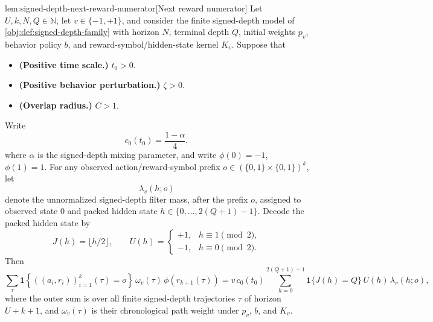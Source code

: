 \documentclass[11pt]{article}
\begin{document}
\begin{lemmav}{lem:signed-depth-next-reward-numerator}[Next reward numerator]
Let \(U,k,N,Q\in\mathbb N\), let \(v\in\{-1,+1\}\), and consider the finite signed-depth model of \cref{obj:def:signed-depth-family} with horizon \(N\), terminal depth \(Q\), initial weights \(p_v\), behavior policy \(b\), and reward-symbol/hidden-state kernel \(K_v\). Suppose that
\begin{itemize}
\item \textbf{(Positive time scale.)} \(t_0>0\).
\item \textbf{(Positive behavior perturbation.)} \(\zeta>0\).
\item \textbf{(Overlap radius.)} \(C>1\).
\end{itemize}
Write
\[
c_0(t_0)=\frac{1-\alpha}{4},
\]
where \(\alpha\) is the signed-depth mixing parameter, and write \(\phi(0)=-1\), \(\phi(1)=1\).  For any observed action/reward-symbol prefix \(o\in(\{0,1\}\times\{0,1\})^k\), let
\[
\lambda_v(h;o)
\]
denote the unnormalized signed-depth filter mass, after the prefix \(o\), assigned to observed state \(0\) and packed hidden state \(h\in\{0,\ldots,2(Q+1)-1\}\).  Decode the packed hidden state by
\[
J(h)=\bigl\lfloor h/2\bigr\rfloor,
\qquad
U(h)=
\begin{cases}
+1, & h \equiv 1 \pmod 2,\\
-1, & h \equiv 0 \pmod 2.
\end{cases}
\]
Then
\[
\sum_{\tau}
\mathbf 1\!\left\{ ((a_i,r_i))_{i=1}^k(\tau)=o\right\}
\,\omega_v(\tau)\,\phi\!\left(r_{k+1}(\tau)\right)
=
v\,c_0(t_0)
\sum_{h=0}^{2(Q+1)-1}
\mathbf 1\{J(h)=Q\}\,U(h)\,\lambda_v(h;o),
\]
where the outer sum is over all finite signed-depth trajectories \(\tau\) of horizon \(U+k+1\), and \(\omega_v(\tau)\) is their chronological path weight under \(p_v\), \(b\), and \(K_v\).
\end{lemmav}
\end{document}

